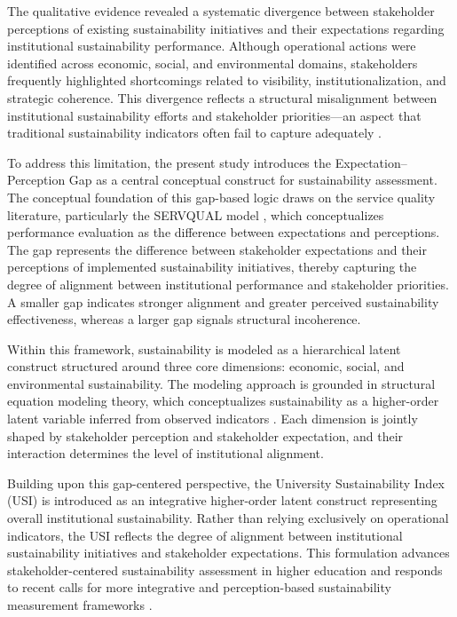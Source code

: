 \documentclass[12pt,a4paper]{article}
\begin{document}
The qualitative evidence revealed a systematic divergence between stakeholder perceptions of existing sustainability initiatives and their expectations regarding institutional sustainability performance. Although operational actions were identified across economic, social, and environmental domains, stakeholders frequently highlighted shortcomings related to visibility, institutionalization, and strategic coherence. This divergence reflects a structural misalignment between institutional sustainability efforts and stakeholder priorities—an aspect that traditional sustainability indicators often fail to capture adequately \cite{6,7}.

To address this limitation, the present study introduces the Expectation--Perception Gap as a central conceptual construct for sustainability assessment. The conceptual foundation of this gap-based logic draws on the service quality literature, particularly the SERVQUAL model \cite{8}, which conceptualizes performance evaluation as the difference between expectations and perceptions. The gap represents the difference between stakeholder expectations and their perceptions of implemented sustainability initiatives, thereby capturing the degree of alignment between institutional performance and stakeholder priorities. A smaller gap indicates stronger alignment and greater perceived sustainability effectiveness, whereas a larger gap signals structural incoherence.

Within this framework, sustainability is modeled as a hierarchical latent construct structured around three core dimensions: economic, social, and environmental sustainability. The modeling approach is grounded in structural equation modeling theory, which conceptualizes sustainability as a higher-order latent variable inferred from observed indicators \cite{9,10}. Each dimension is jointly shaped by stakeholder perception and stakeholder expectation, and their interaction determines the level of institutional alignment.

Building upon this gap-centered perspective, the University Sustainability Index (USI) is introduced as an integrative higher-order latent construct representing overall institutional sustainability. Rather than relying exclusively on operational indicators, the USI reflects the degree of alignment between institutional sustainability initiatives and stakeholder expectations. This formulation advances stakeholder-centered sustainability assessment in higher education and responds to recent calls for more integrative and perception-based sustainability measurement frameworks \cite{7}.
\end{document}
